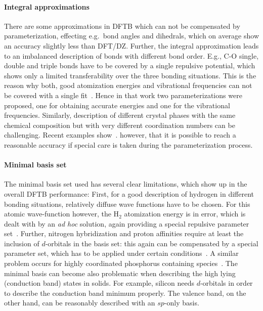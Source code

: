 \documentclass[reprint,onecolumn,superscriptaddress]{revtex4-1}
\begin{document}
\paragraph{Integral approximations} There are some approximations
in DFTB which can not be compensated by parameterization, effecting e.g.\ bond
angles and dihedrals, which on average show an accuracy slightly less than
DFT/DZ. Further, the integral approximation leads to an imbalanced description
of bonds with different bond order. E.g., C-O single, double and triple bonds
have to be covered by a single repulsive potential, which shows only a limited
transferability over the three bonding situations. This is the reason why both,
good atomization energies and vibrational frequencies can not be covered with a
single fit~\cite{Gaus2012}. Hence in that work two parameterizations were
proposed, one for obtaining accurate energies and one for the vibrational
frequencies.  Similarly, description of different crystal phases with the same
chemical composition but with very different coordination numbers can be
challenging. Recent examples show~\cite{Hellstrom2013,Fihey2015}. however, that
it is possible to reach a reasonable accuracy if special care is taken during
the parameterization process.

\paragraph{Minimal basis set}
The minimal basis set used has several clear limitations, which show up in the
overall DFTB performance: First, for a good description of hydrogen in different
bonding situations, relatively diffuse wave functions have to be chosen.  For
this atomic wave-function however, the H$_2$ atomization energy is in error,
which is dealt with by an {\it ad hoc} solution, again providing a special
repulsive parameter set~\cite{Gaus2012}. Further, nitrogen hybridization and
proton affinities require at least the inclusion of $d$-orbitals in the basis
set: this again can be compensated by a special parameter set, which has to be
applied under certain conditions~\cite{Gaus2012}. A similar problem occurs for
highly coordinated phosphorus containing species~\cite{Gaus2015}. The minimal
basis can become also problematic when describing the high lying (conduction
band) states in solids. For example, silicon needs $d$-orbitals in order to
describe the conduction band minimum properly. The valence band, on the other
hand, can be reasonably described with an $sp$-only basis.
\end{document}
